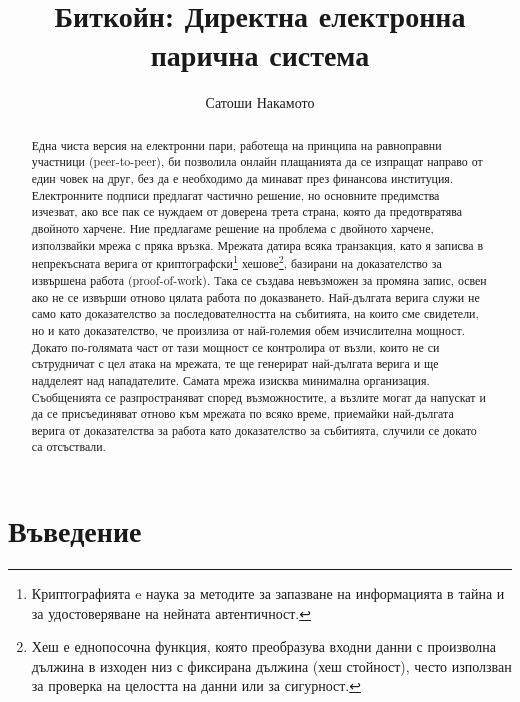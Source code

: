 \documentclass[11pt,a4paper]{article}
\title{\textbf{Биткойн: Директна електронна парична система}}
\author{Сатоши Накамото}
\date{}
\begin{document}
\maketitle

\begin{abstract}
Една чиста версия на електронни пари, работеща на принципа на равноправни участници (peer-to-peer), би позволила онлайн плащанията да се изпращат направо от един човек на друг, без да е необходимо да минават през финансова институция. Електронните подписи предлагат частично решение, но основните предимства изчезват, ако все пак се нуждаем от доверена трета страна, която да предотвратява двойното харчене. Ние предлагаме решение на проблема с двойното харчене, използвайки мрежа с пряка връзка. Мрежата датира всяка транзакция, като я записва в непрекъсната верига от криптографски\footnote{Криптографията e наука за методите за запазване на информацията в тайна и за удостоверяване на нейната автентичност.} хешове\footnote{Хеш е еднопосочна функция, която преобразува входни данни с произволна дължина в изходен низ с фиксирана дължина (хеш стойност), често използван за проверка на целостта на данни или за сигурност.}, базирани на доказателство за извършена работа (proof-of-work). Така се създава невъзможен за промяна запис, освен ако не се извърши отново цялата работа по доказването. Най-дългата верига служи не само като доказателство за последователността на събитията, на които сме свидетели, но и като доказателство, че произлиза от най-големия обем изчислителна мощност. Докато по-голямата част от тази мощност се контролира от възли, които не си сътрудничат с цел атака на мрежата, те ще генерират най-дългата верига и ще надделеят над нападателите. Самата мрежа изисква минимална организация. Съобщенията се разпространяват според възможностите, а възлите могат да напускат и да се присъединяват отново към мрежата по всяко време, приемайки най-дългата верига от доказателства за работа като доказателство за събитията, случили се докато са отсъствали.
\end{abstract}

\section{Въведение}
\end{document}
